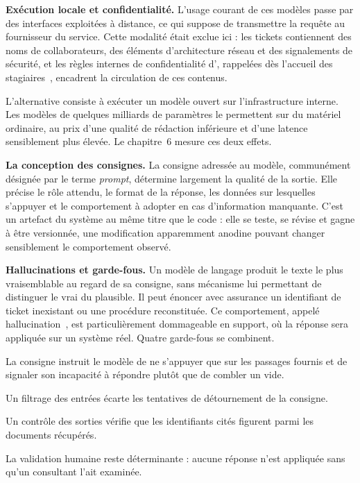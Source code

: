 \textbf{Exécution locale et confidentialité.} L'usage courant de ces modèles passe par des interfaces exploitées à distance, ce qui suppose de
transmettre la requête au fournisseur du service. Cette modalité était exclue ici : les tickets
contiennent des noms de collaborateurs, des éléments d'architecture réseau et des signalements de
sécurité, et les règles internes de confidentialité d'\otbs, rappelées dès l'accueil des
stagiaires~\cite{otbs-integration}, encadrent la circulation de ces contenus.

L'alternative consiste à exécuter un modèle ouvert sur l'infrastructure interne. Les modèles de
quelques milliards de paramètres le permettent sur du matériel ordinaire, au prix d'une qualité de
rédaction inférieure et d'une latence sensiblement plus élevée. Le chapitre~6 mesure ces deux effets.

\textbf{La conception des consignes.} La consigne adressée au modèle, communément désignée par le terme \emph{prompt}, détermine largement
la qualité de la sortie. Elle précise le rôle attendu, le format de la réponse, les données sur
lesquelles s'appuyer et le comportement à adopter en cas d'information manquante. C'est un artefact
du système au même titre que le code : elle se teste, se révise et gagne à être versionnée, une
modification apparemment anodine pouvant changer sensiblement le comportement observé.

\textbf{Hallucinations et garde-fous.} Un modèle de langage produit le texte le plus vraisemblable au regard de sa consigne, sans mécanisme
lui permettant de distinguer le vrai du plausible. Il peut énoncer avec assurance un identifiant de
ticket inexistant ou une procédure reconstituée. Ce comportement, appelé
hallucination~\cite{ji2023}, est
particulièrement dommageable en support, où la réponse sera appliquée sur un système réel. Quatre
garde-fous se combinent.

\begin{puces}
\item La consigne instruit le modèle de ne s'appuyer que sur les passages fournis et de signaler son
incapacité à répondre plutôt que de combler un vide.
\item Un filtrage des entrées écarte les tentatives de détournement de la consigne.
\item Un contrôle des sorties vérifie que les identifiants cités figurent parmi les documents
récupérés.
\item La validation humaine reste déterminante : aucune réponse n'est appliquée sans qu'un
consultant l'ait examinée.
\end{puces}

